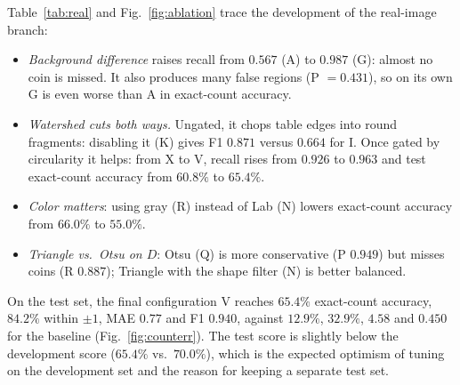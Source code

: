\documentclass[conference,a4paper]{IEEEtran}
\begin{document}
Table~\ref{tab:real} and Fig.~\ref{fig:ablation} trace the development of the real-image branch:
\begin{itemize}
\item \emph{Background difference} raises recall from $0.567$ (A) to $0.987$ (G): almost no coin is missed. It also produces many false regions (P $=0.431$), so on its own G is even worse than A in exact-count accuracy.
\item \emph{Watershed cuts both ways.} Ungated, it chops table edges into round fragments: disabling it (K) gives F1 $0.871$ versus $0.664$ for I. Once gated by circularity it helps: from X to V, recall rises from $0.926$ to $0.963$ and test exact-count accuracy from $60.8\%$ to $65.4\%$.
\item \emph{Color matters}: using gray (R) instead of Lab (N) lowers exact-count accuracy from $66.0\%$ to $55.0\%$.
\item \emph{Triangle vs.\ Otsu on $D$}: Otsu (Q) is more conservative (P $0.949$) but misses coins (R $0.887$); Triangle with the shape filter (N) is better balanced.
\end{itemize}
On the test set, the final configuration V reaches $65.4\%$ exact-count accuracy, $84.2\%$ within $\pm1$, MAE $0.77$ and F1 $0.940$, against $12.9\%$, $32.9\%$, $4.58$ and $0.450$ for the baseline (Fig.~\ref{fig:counterr}). The test score is slightly below the development score ($65.4\%$ vs.\ $70.0\%$), which is the expected optimism of tuning on the development set and the reason for keeping a separate test set.

\end{document}
